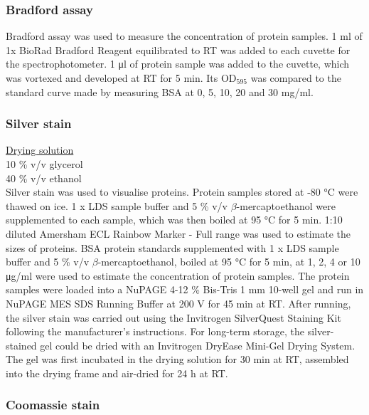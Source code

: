 \subsubsection{Bradford assay}

Bradford assay was used to measure the concentration of protein samples. 1 \si{\milli\litre} of 1x BioRad Bradford Reagent equilibrated to RT was added to each cuvette for the spectrophotometer. 1 \si{\micro\litre} of protein sample was added to the cuvette, which was vortexed and developed at RT for 5 \si{\minute}. Its OD$_{595}$ was compared to the standard curve made by measuring BSA at 0, 5, 10, 20 and 30 \si{\milli\gram/\milli\litre}. 

\subsubsection{Silver stain}

\underline{Drying solution} \\
10 \% v/v glycerol\\
40 \% v/v ethanol \\

Silver stain was used to visualise proteins. Protein samples stored at -80 \si{\celsius} were thawed on ice. 1 x LDS sample buffer and 5 \% v/v $\beta$-mercaptoethanol were supplemented to each sample, which was then boiled at 95 \si{\celsius} for 5 \si{\minute}. 1:10 diluted Amersham ECL Rainbow Marker - Full range was used to estimate the sizes of proteins. BSA protein standards supplemented with 1 x LDS sample buffer and 5 \% v/v $\beta$-mercaptoethanol, boiled at 95 \si{\celsius} for 5 \si{\minute}, at 1, 2, 4 or 10 \si{\micro\gram/\milli\litre} were used to estimate the concentration of protein samples. The protein samples were loaded into a NuPAGE 4-12 \% Bis-Tris 1 \si{\milli\metre} 10-well gel and run in NuPAGE MES SDS Running Buffer at 200 \si{\volt} for 45 \si{\minute} at RT. After running, the silver stain was carried out using the Invitrogen SilverQuest Staining Kit following the manufacturer's instructions. For long-term storage, the silver-stained gel could be dried with an Invitrogen DryEase Mini-Gel Drying System. The gel was first incubated in the drying solution for 30 \si{\minute} at RT, assembled into the drying frame and air-dried for 24 \si{\hour} at RT. 

\subsubsection{Coomassie stain}

